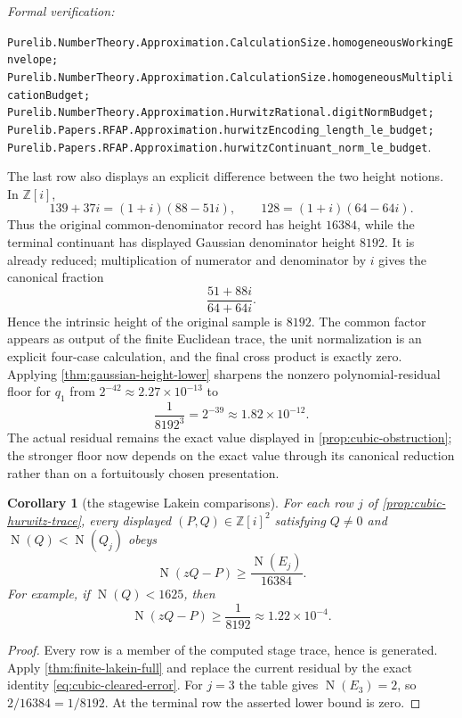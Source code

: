 \documentclass[11pt]{article}
\newtheorem{corollary}[corollary]{Corollary}
\newcommand{\Zi}{\mathbb{Z}[i]}
\newcommand{\Norm}[1]{\operatorname{N}\!\left(#1\right)}
\newcommand{\leanref}[1]{\par\smallskip\noindent
  \emph{Formal verification:}\par\nobreak
  {\raggedright\nolinkurl{#1}.\par}}
\begin{document}
\leanref{Purelib.NumberTheory.Approximation.CalculationSize.homogeneousWorkingEnvelope;
Purelib.NumberTheory.Approximation.CalculationSize.homogeneousMultiplicationBudget;
Purelib.NumberTheory.Approximation.HurwitzRational.digitNormBudget;
Purelib.Papers.RFAP.Approximation.hurwitzEncoding_length_le_budget;
Purelib.Papers.RFAP.Approximation.hurwitzContinuant_norm_le_budget}

The last row also displays an explicit difference between the two height
notions.  In $\Zi$,
\[
 139+37i=(1+i)(88-51i),\qquad
 128=(1+i)(64-64i).
\]
Thus the original common-denominator record has height $16384$, while the
terminal continuant has displayed Gaussian denominator height $8192$.  It is
already reduced; multiplication of numerator and denominator by $i$ gives
the canonical fraction
\[
                         \frac{51+88i}{64+64i}.
\]
Hence the intrinsic height of the original sample is $8192$.  The common
factor appears as output of the finite Euclidean trace, the unit
normalization is an explicit four-case calculation, and the final cross
product is exactly zero.  Applying
\cref{thm:gaussian-height-lower} sharpens the
nonzero polynomial-residual floor for $q_1$ from
$2^{-42}\approx2.27\mathbin{\times}10^{-13}$ to
\[
                   \frac1{8192^3}=2^{-39}
                     \approx1.82\mathbin{\times}10^{-12}.
\]
The actual residual remains the exact value displayed in
\cref{prop:cubic-obstruction}; the stronger floor now depends on the exact
value through its canonical reduction rather than on a fortuitously chosen
presentation.

\begin{corollary}[the stagewise Lakein comparisons]
\label{cor:cubic-lakein}
For each row $j$ of \cref{prop:cubic-hurwitz-trace}, every displayed
$(P,Q)\in\Zi^2$ satisfying $Q\ne0$ and
$\Norm Q<\Norm{Q_j}$ obeys
\[
             \Norm{zQ-P}\ge\frac{\Norm{E_j}}{16384}.
\]
For example, if $\Norm Q<1625$, then
\[
             \Norm{zQ-P}\ge\frac1{8192}
                     \approx1.22\mathbin{\times}10^{-4}.
\]
\end{corollary}

\begin{proof}
Every row is a member of the computed stage trace, hence is generated.  Apply
\cref{thm:finite-lakein-full} and replace the current residual by the exact
identity \eqref{eq:cubic-cleared-error}.  For $j=3$ the table gives
$\Norm{E_3}=2$, so $2/16384=1/8192$.  At the terminal row the asserted lower
bound is zero.
\end{proof}
\end{document}
